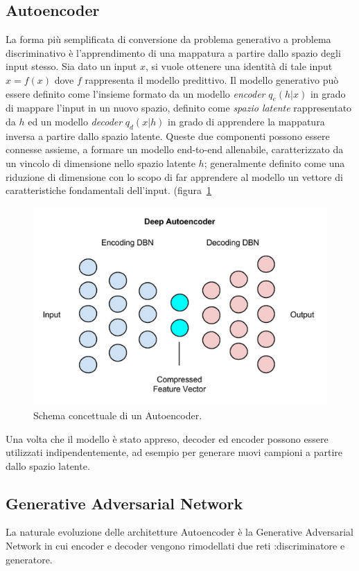 \subsection{Autoencoder}
La forma più semplificata di conversione da problema generativo a problema discriminativo è l'apprendimento di una mappatura a partire dallo spazio degli input stesso. Sia dato un input $x$, si vuole ottenere una identità di tale input $x=f(x)$ dove $f$ rappresenta il modello predittivo. Il modello generativo può essere definito come l'insieme formato da un modello \textit{encoder} $q_e(h|x)$ in grado di mappare l'input in un nuovo spazio, definito come \textit{spazio latente} rappresentato da $h$ ed un modello \textit{decoder} $q_d(x|h)$ in grado di apprendere la mappatura inversa a partire dallo spazio latente.
Queste due componenti possono essere connesse assieme, a formare un modello end-to-end allenabile, caratterizzato da un vincolo di dimensione nello spazio latente $h$; generalmente definito come una riduzione di dimensione con lo scopo di far apprendere al modello un vettore di caratteristiche fondamentali dell'input. (figura~\ref{fig:aut}

\begin{figure}[!bp]
	\centering
	\includegraphics[width=\columnwidth]{figures/deep_autoencoder.png}
	\caption{Schema concettuale di un Autoencoder.  \label{fig:aut} }
\end{figure}

Una volta che il modello è stato appreso, decoder ed encoder possono essere utilizzati indipendentemente, ad esempio per generare nuovi campioni a partire dallo spazio latente.

\subsection{Generative Adversarial Network}
La naturale evoluzione delle architetture Autoencoder è la Generative Adversarial Network in cui encoder e decoder vengono rimodellati due reti :discriminatore e generatore. 

